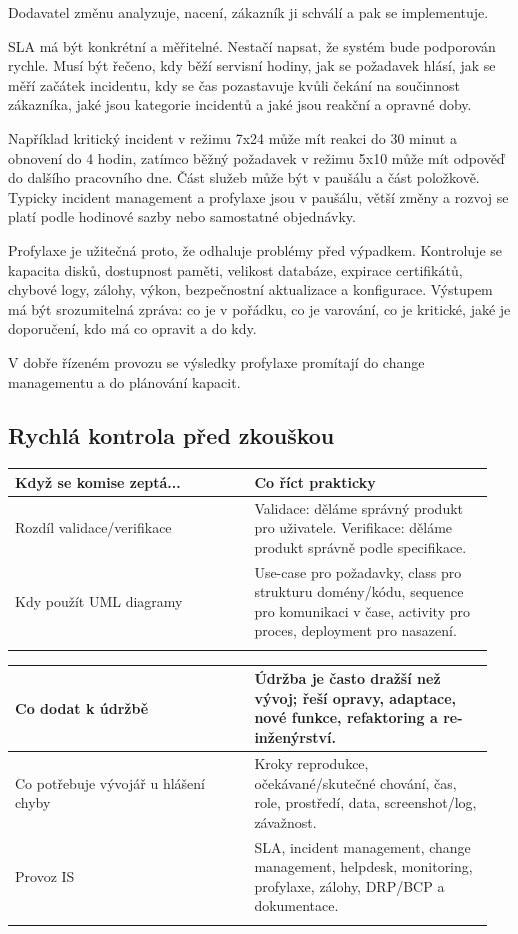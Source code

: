 Dodavatel změnu analyzuje, nacení, zákazník ji schválí a pak se implementuje.

SLA má být konkrétní a měřitelné. Nestačí napsat, že systém bude podporován rychle. Musí být řečeno, kdy běží servisní hodiny, jak se požadavek hlásí, jak se měří začátek incidentu, kdy se čas pozastavuje kvůli čekání na součinnost zákazníka, jaké jsou kategorie incidentů a jaké jsou reakční a opravné doby.

Například kritický incident v režimu 7x24 může mít reakci do 30 minut a obnovení do 4 hodin, zatímco běžný požadavek v režimu 5x10 může mít odpověď do dalšího pracovního dne. Část služeb může být v paušálu a část položkově. Typicky incident management a profylaxe jsou v paušálu, větší změny a rozvoj se platí podle hodinové sazby nebo samostatné objednávky.

Profylaxe je užitečná proto, že odhaluje problémy před výpadkem. Kontroluje se kapacita disků, dostupnost paměti, velikost databáze, expirace certifikátů, chybové logy, zálohy, výkon, bezpečnostní aktualizace a konfigurace. Výstupem má být srozumitelná zpráva: co je v pořádku, co je varování, co je kritické, jaké je doporučení, kdo má co opravit a do kdy.

V dobře řízeném provozu se výsledky profylaxe promítají do change managementu a do plánování kapacit.

\subsection*{Rychlá kontrola před zkouškou}

\begin{longtable}{p{0.475\linewidth}p{0.475\linewidth}}
\toprule
\textbf{Když se komise zeptá...} & \textbf{Co říct prakticky} \\
\midrule\endhead
Rozdíl validace/verifikace & Validace: děláme správný produkt pro uživatele. Verifikace: děláme produkt správně podle specifikace. \\
\addlinespace
Kdy použít UML diagramy & Use-case pro požadavky, class pro strukturu domény/kódu, sequence pro komunikaci v čase, activity pro proces, deployment pro nasazení. \\
\addlinespace
\bottomrule
\end{longtable}

\begin{longtable}{p{0.475\linewidth}p{0.475\linewidth}}
\toprule
\textbf{Co dodat k údržbě} & \textbf{Údržba je často dražší než vývoj; řeší opravy, adaptace, nové funkce, refaktoring a re-inženýrství.} \\
\midrule\endhead
Co potřebuje vývojář u hlášení chyby & Kroky reprodukce, očekávané/skutečné chování, čas, role, prostředí, data, screenshot/log, závažnost. \\
\addlinespace
Provoz IS & SLA, incident management, change management, helpdesk, monitoring, profylaxe, zálohy, DRP/BCP a dokumentace. \\
\addlinespace
\bottomrule
\end{longtable}

